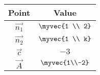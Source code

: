 \begin{tabular}[12pt]{ |c| c|}
    \hline
    \textbf{Point} & \textbf{Value}\\ 
    \hline
    $\vec{n_1}$ & $\myvec{1 \\ 2}$\\
    \hline
    $\vec{n_2}$ & $\myvec{1 \\ k}$\\
    \hline
	$\vec{c}$ & $-3$\\
    \hline
    $\vec{A}$ & $\myvec{1\\-2}$\\
    \hline
\end{tabular}